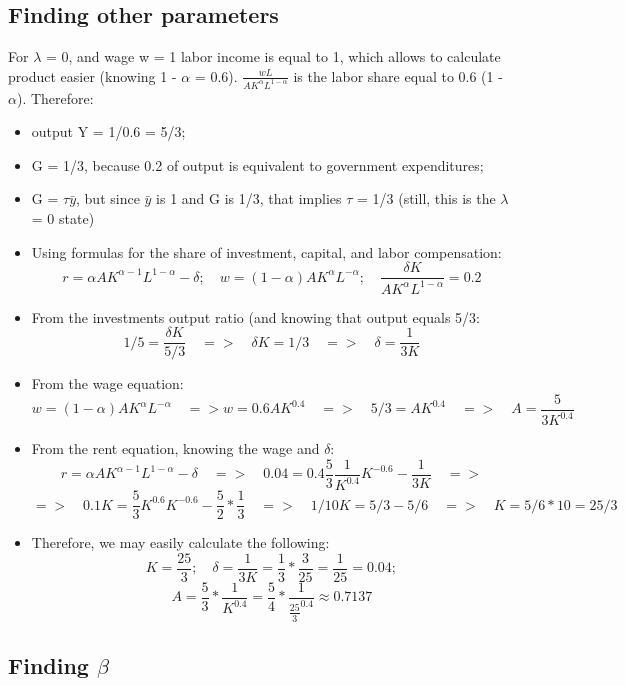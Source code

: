 \documentclass{article}
\begin{document}
\subsection{Finding other parameters}
For \(\lambda\) = 0, and wage w = 1 labor income is equal to 1, which allows to calculate product easier (knowing 1 - \(\alpha\) = 0.6). \(\frac{wL}{A K^{\alpha} L^{1 - \alpha}}\) is the labor share equal to 0.6 (1 - \(\alpha\)). Therefore:
\begin{itemize}
    \item output Y = 1/0.6 = 5/3;
    \item G = 1/3, because 0.2 of output is equivalent to government expenditures; 
    \item G = \(\tau\)\(\bar{y}\), but since \(\bar{y}\) is 1 and G is 1/3, that implies \(\tau\) = 1/3 (still, this is the \(\lambda\) = 0 state)
     \item Using formulas for the share of investment, capital, and  labor compensation: 
        \[
r = \alpha A K^{\alpha - 1} L^{1 - \alpha} - \delta; \quad w = (1 - \alpha) A K^{\alpha} L^{-\alpha}; \quad \frac{\delta K}{A K^{\alpha} L^{1 - \alpha}} = 0.2
\]
\item From the investments output ratio (and knowing that output equals 5/3:
        \[
1/5 = \frac{\delta K}{5/3} \quad=> \quad {\delta K} = 1/3 \quad => \quad {\delta }= \frac{1}{3 K}
\]

\item From the wage equation:
        \[
w = (1 - \alpha) A K^{\alpha} L^{-\alpha} \quad => w = 0.6 A K^{0.4} \quad => \quad 5/3 = A K^{0.4} \quad => \quad A=\frac{5}{3K^{0.4}}
\]


\item From the rent equation, knowing the wage and \(\delta\):
\[
r = \alpha A K^{\alpha - 1} L^{1 - \alpha} - \delta \quad => \quad 0.04 = 0.4\frac{5}{3}\frac{1}{K^{0.4}} K^{-0.6} - \frac{1}{3 K} \quad =>
\]
        \[
=> \quad 0.1K = \frac{5}{3}K^{0.6} K^{-0.6} - \frac{5}{2}*\frac{1}{3} \quad => \quad 1/10K=5/3-5/6 \quad => \quad K=5/6*10=25/3
\]

\item Therefore, we may easily calculate the following:
        \[
K=\frac{25}{3}; \quad \delta = \frac{1}{3K}=\frac{1}{3}*\frac{3}{25}=\frac{1}{25}=0.04;
\]
        \[
A = \frac{5}{3}*\frac{1}{K^{0.4}}=\frac{5}{4}*\frac{1}{\frac{25}{3}^{0.4}} \approx 0.7137
\]
\end{itemize}

\subsection{Finding \(\beta\)}
\end{document}
